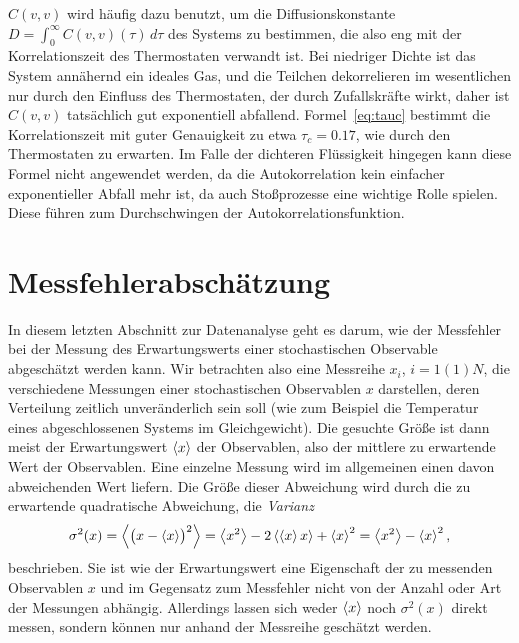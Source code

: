 $C(v,v)$ wird häufig dazu benutzt, um die Diffusionskonstante $D =
\int_0^{\infty} C(v,v)(\tau)\, d\tau$ des Systems zu bestimmen, die
also eng mit der Korrelationszeit des Thermostaten verwandt ist.  Bei
niedriger Dichte ist das System annähernd ein ideales Gas, und die
Teilchen dekorrelieren im wesentlichen nur durch den Einfluss des
Thermostaten, der durch Zufallskräfte wirkt, daher ist $C(v,v)$
tatsächlich gut exponentiell abfallend.  Formel~\eqref{eq:tauc}
bestimmt die Korrelationszeit mit guter Genauigkeit zu etwa
$\tau_c=0.17$, wie durch den Thermostaten zu erwarten. Im Falle der
dichteren Flüssigkeit hingegen kann diese Formel nicht angewendet
werden, da die Autokorrelation kein einfacher exponentieller Abfall
mehr ist, da auch Stoßprozesse eine wichtige Rolle spielen. Diese
führen zum Durchschwingen der Autokorrelationsfunktion.

\section{Messfehlerabschätzung}

In diesem letzten Abschnitt zur Datenanalyse geht es darum, wie der
Messfehler bei der Messung des Erwartungswerts einer stochastischen
Observable abgeschätzt werden kann. Wir betrachten also eine Messreihe
$x_i$, $i=1(1)N$, die verschiedene Messungen einer stochastischen
Observablen $x$ darstellen, deren Verteilung zeitlich unveränderlich
sein soll (wie zum Beispiel die Temperatur eines abgeschlossenen
Systems im Gleichgewicht). Die gesuchte Größe ist dann meist der
Erwartungswert $\left\langle{x}\right\rangle$ der Observablen, also der mittlere zu
erwartende Wert der Observablen. Eine einzelne Messung wird im
allgemeinen einen davon abweichenden Wert liefern. Die Größe dieser
Abweichung wird durch die zu erwartende quadratische Abweichung, die
\emph{Varianz}
\begin{equation}
  \sigma^2(x) = \left\langle{\bigl(x-\left\langle{x}\right\rangle\bigr)^2}\right\rangle
  = \left\langle{x^2}\right\rangle - 2\left\langle{\left\langle{x}\right\rangle x}\right\rangle  + \left\langle{x}\right\rangle^2
  = \left\langle{x^2}\right\rangle - \left\langle{x}\right\rangle^2,
\end{equation}
beschrieben. Sie ist wie der Erwartungswert eine Eigenschaft der zu
messenden Observablen $x$ und im Gegensatz zum Messfehler nicht von
der Anzahl oder Art der Messungen abhängig. Allerdings lassen sich
weder $\left\langle{x}\right\rangle$ noch $\sigma^2(x)$ direkt messen, sondern können nur
anhand der Messreihe geschätzt werden.


